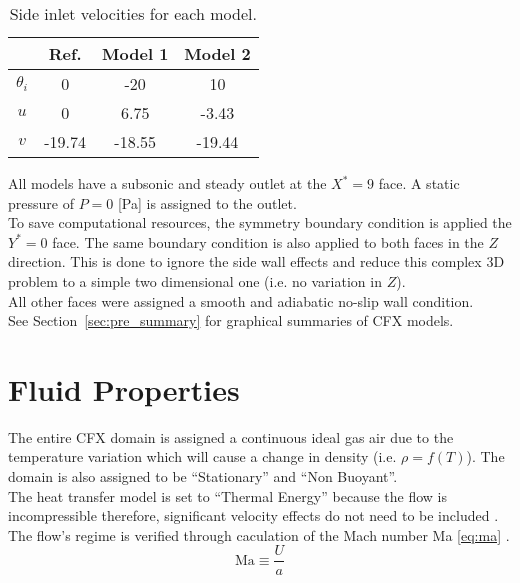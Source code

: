 \begin{table}[H]
	\centering
	\caption{Side inlet velocities for each model.}
	\begin{tabular}{cccc}
		\toprule		
		\multicolumn{1}{c}{} & \textbf{Ref.} & \textbf{Model 1} & \textbf{ Model 2} \\
		\midrule
		$\theta_i$	& 0            & -20             & 10		\\
		$u$			& 0            & 6.75            & -3.43	\\
		$v$ 		& -19.74       & -18.55          & -19.44	\\
		\bottomrule
	\end{tabular}
	\label{tab:sideinletbc}
\end{table}

All models have a subsonic and steady outlet at the $X^*=9$ face. A static pressure of $P=0$ [Pa] is assigned to the outlet.\\

To save computational resources, the symmetry boundary condition is applied the $Y^*=0$ face. The same boundary condition is also applied to both faces in the $Z$ direction. This is done to ignore the side wall effects and reduce this complex 3D problem to a simple two dimensional one (i.e. no variation in $Z$).\\

All other faces were assigned a smooth and adiabatic no-slip wall condition. \\

See Section~\ref{sec:pre_summary} for graphical summaries of CFX models.
\section{Fluid Properties}
\label{sec:pre_fluid}

The entire CFX domain is assigned a continuous ideal gas air due to the temperature variation which will cause a change in density (i.e. $\rho=f(T)$). The domain is also assigned to be ``Stationary'' and ``Non Buoyant''.\\

The heat transfer model is set to ``Thermal Energy'' because the flow is incompressible  therefore, significant velocity effects do not need to be included \cite{tut}. The flow's regime is verified through caculation of the Mach number Ma \ref{eq:ma} \cite{fluids}.
\begin{equation}
	\label{eq:ma}
	 \text{Ma}\equiv \frac{U}{a} 
\end{equation}


